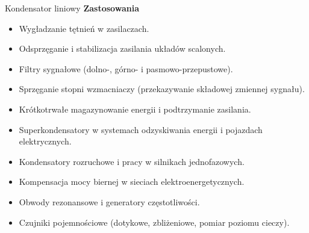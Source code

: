 \begin{frame}{Kondensator liniowy}
	\textbf{Zastosowania}\\
	\begin{itemize}
		\item[\bt] Wygładzanie tętnień w zasilaczach.
		\item[\bt] Odsprzęganie i stabilizacja zasilania układów scalonych.
		\item[\bt] Filtry sygnałowe (dolno-, górno- i pasmowo-przepustowe).
		\item[\bt] Sprzęganie stopni wzmacniaczy (przekazywanie składowej zmiennej sygnału).
		\item[\bt] Krótkotrwałe magazynowanie energii i podtrzymanie zasilania.
		\item[\bt] Superkondensatory w systemach odzyskiwania energii i pojazdach elektrycznych.
		\item[\bt] Kondensatory rozruchowe i pracy w silnikach jednofazowych.
		\item[\bt] Kompensacja mocy biernej w sieciach elektroenergetycznych.
		\item[\bt] Obwody rezonansowe i generatory częstotliwości.
		\item[\bt] Czujniki pojemnościowe (dotykowe, zbliżeniowe, pomiar poziomu cieczy).
	\end{itemize}
\end{frame}

